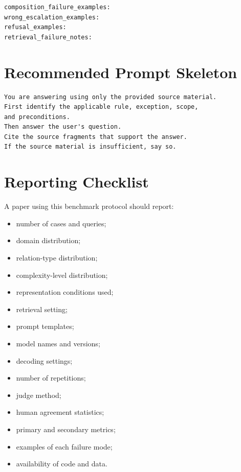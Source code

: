 \documentclass[11pt]{article}
\begin{document}
\begin{verbatim}
composition_failure_examples:
wrong_escalation_examples:
refusal_examples:
retrieval_failure_notes:
\end{verbatim}

\section{Recommended Prompt Skeleton}

\begin{verbatim}
You are answering using only the provided source material.
First identify the applicable rule, exception, scope,
and preconditions.
Then answer the user's question.
Cite the source fragments that support the answer.
If the source material is insufficient, say so.
\end{verbatim}

\section{Reporting Checklist}

A paper using this benchmark protocol should report:

\begin{itemize}[leftmargin=*,itemsep=2pt]
    \item number of cases and queries;
    \item domain distribution;
    \item relation-type distribution;
    \item complexity-level distribution;
    \item representation conditions used;
    \item retrieval setting;
    \item prompt templates;
    \item model names and versions;
    \item decoding settings;
    \item number of repetitions;
    \item judge method;
    \item human agreement statistics;
    \item primary and secondary metrics;
    \item examples of each failure mode;
    \item availability of code and data.
\end{itemize}
\end{document}
